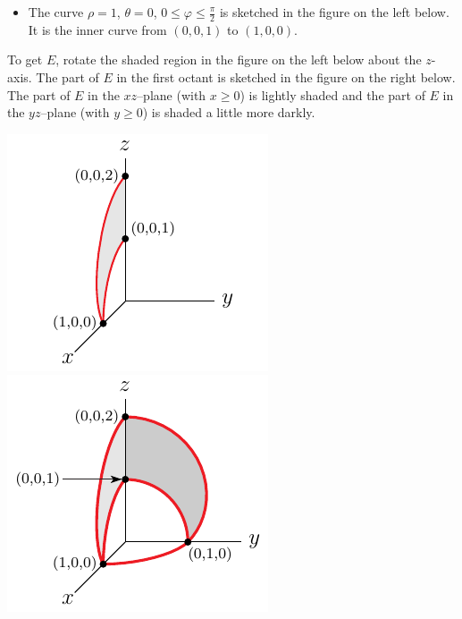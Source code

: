 \begin{solution}
\begin{itemize}
\begin{itemize}
\item
The curve $\rho=1$, $\theta=0$, $0\le\varphi\le\frac{\pi}{2}$
is sketched in the figure on the left below. It is the inner curve from
$(0,0,1)$ to $(1,0,0)$.

\end{itemize}
To get $E$, rotate the shaded region in the figure on the left below
about the $z$-axis. The part of $E$ in the first octant is sketched
in the figure on the right below. The part of $E$ in the $xz$--plane 
(with $x\ge 0$) is lightly shaded and the part of $E$ in the $yz$--plane 
(with $y\ge 0$) is shaded a little more darkly.

\begin{center}
     \includegraphics{fig/OE06A_8aa.pdf}\qquad
     \includegraphics{fig/OE06A_8bb.pdf}
\end{center}
\end{itemize}


\end{solution}
